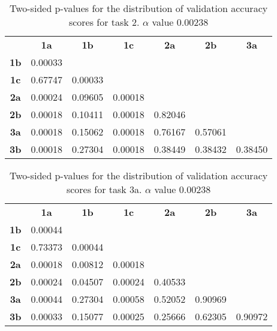 \begin{table}[!ht]
    \centering
    \begin{tabular}{ccccccc}
                & \textbf{1a} & \textbf{1b} & \textbf{1c} & \textbf{2a}  & \textbf{2b}  & \textbf{3a}  \\
    \textbf{1b} & 0.00033 &         &         &         &         &         \\
    \textbf{1c} & 0.67747 & 0.00033 &         &         &         &         \\
    \textbf{2a} & 0.00024 & 0.09605 & 0.00018 &         &         &         \\
    \textbf{2b} & 0.00018 & 0.10411 & 0.00018 & 0.82046 &         &         \\
    \textbf{3a} & 0.00018 & 0.15062 & 0.00018 & 0.76167 & 0.57061 &         \\
    \textbf{3b} & 0.00018 & 0.27304 & 0.00018 & 0.38449 & 0.38432 & 0.38450
    \end{tabular}
    \caption[Experiment 2: p-table for validation accuracy (task 2)]{Two-sided p-values for the distribution of validation accuracy scores for task 2. \(\alpha\) value 0.00238}
    \label{tab:exp2.validation2}
\end{table}

\newpage

\begin{table}[!ht]
    \centering
    \begin{tabular}{ccccccc}
                & \textbf{1a} & \textbf{1b} & \textbf{1c} & \textbf{2a}  & \textbf{2b}  & \textbf{3a}  \\
    \textbf{1b} & 0.00044 &         &         &         &         &         \\
    \textbf{1c} & 0.73373 & 0.00044 &         &         &         &         \\
    \textbf{2a} & 0.00018 & 0.00812 & 0.00018 &         &         &         \\
    \textbf{2b} & 0.00024 & 0.04507 & 0.00024 & 0.40533 &         &         \\
    \textbf{3a} & 0.00044 & 0.27304 & 0.00058 & 0.52052 & 0.90969 &         \\
    \textbf{3b} & 0.00033 & 0.15077 & 0.00025 & 0.25666 & 0.62305 & 0.90972
    \end{tabular}
    \caption[Experiment 2: p-table for validation accuracy (task 3a)]{Two-sided p-values for the distribution of validation accuracy scores for task 3a. \(\alpha\) value 0.00238}
    \label{tab:exp2.validation3a}
\end{table}

